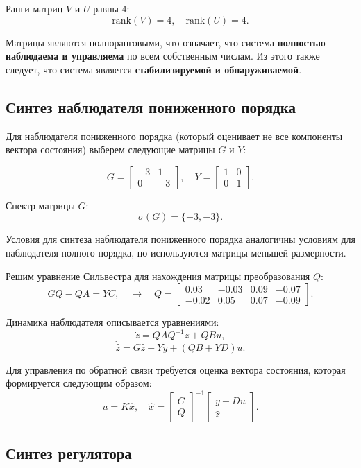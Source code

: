 Ранги матриц $V$ и $U$ равны 4:
\[
    \text{rank}(V) = 4, \quad \text{rank}(U) = 4.
\]

Матрицы являются полноранговыми, что означает, что система \textbf{полностью наблюдаема и управляема} по всем собственным числам. Из этого также следует, что система является \textbf{стабилизируемой и обнаруживаемой}.

\subsection{Синтез наблюдателя пониженного порядка}

Для наблюдателя пониженного порядка (который оценивает не все компоненты вектора состояния) выберем следующие матрицы $G$ и $Y$:

\[
G = \begin{bmatrix}
    -3 & 1 \\
    0 & -3
\end{bmatrix}, \quad
Y = \begin{bmatrix}
    1 & 0 \\
    0 & 1
\end{bmatrix}.
\]

Спектр матрицы $G$:
\[
    \sigma(G) = \{-3, -3\}.
\]

Условия для синтеза наблюдателя пониженного порядка аналогичны условиям для наблюдателя полного порядка, но используются матрицы меньшей размерности.

Решим уравнение Сильвестра для нахождения матрицы преобразования $Q$:
\[
GQ - QA = YC, \quad \rightarrow \quad Q = \begin{bmatrix}
    0.03 & -0.03 & 0.09 & -0.07 \\
    -0.02 & 0.05 & 0.07 & -0.09
\end{bmatrix}.
\]

Динамика наблюдателя описывается уравнениями:
\[
    \dot{z} = QAQ^{-1}z + QBu,
\]
\[
    \dot{\hat{z}} = G\hat{z} - Yy + (QB + YD)u.
\]

Для управления по обратной связи требуется оценка вектора состояния, которая формируется следующим образом:
\[
    u = K\hat{x}, \quad \hat{x} = \begin{bmatrix}
    C \\
    Q
\end{bmatrix}^{-1} \begin{bmatrix}
    y - Du \\
\hat{z}
\end{bmatrix}.
\]

\subsection{Синтез регулятора}

